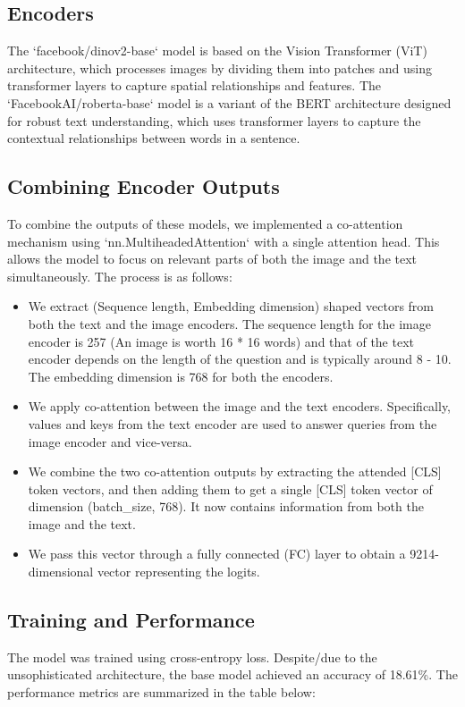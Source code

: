 \documentclass[conference]{IEEEtran}
\begin{document}
\subsection*{Encoders}

The `facebook/dinov2-base` model is based on the Vision Transformer (ViT) architecture, which processes images by dividing them into patches and using transformer layers to capture spatial relationships and features. The `FacebookAI/roberta-base` model is a variant of the BERT architecture designed for robust text understanding, which uses transformer layers to capture the contextual relationships between words in a sentence.

\subsection*{Combining Encoder Outputs}

To combine the outputs of these models, we implemented a co-attention mechanism using `nn.MultiheadedAttention` with a single attention head. This allows the model to focus on relevant parts of both the image and the text simultaneously. The process is as follows:

\begin{itemize}
    \item We extract (Sequence length, Embedding dimension) shaped vectors from both the text and the image encoders. The sequence length for the image encoder is 257 (An image is worth 16 * 16 words) and that of the text encoder depends on the length of the question and is typically around 8 - 10. The embedding dimension is 768 for both the encoders.
    \item We apply co-attention between the image and the text encoders. Specifically, values and keys from the text encoder are used to answer queries from the image encoder and vice-versa.
    \item We combine the two co-attention outputs by extracting the attended [CLS] token vectors, and then adding them to get a single [CLS] token vector of dimension (batch\_size, 768). It now contains information from both the image and the text.
    \item We pass this vector through a fully connected (FC) layer to obtain a 9214-dimensional vector representing the logits.
\end{itemize}

\subsection*{Training and Performance}
The model was trained using cross-entropy loss. Despite/due to the unsophisticated architecture, the base model achieved an accuracy of 18.61\%. The performance metrics are summarized in the table below:
\end{document}

